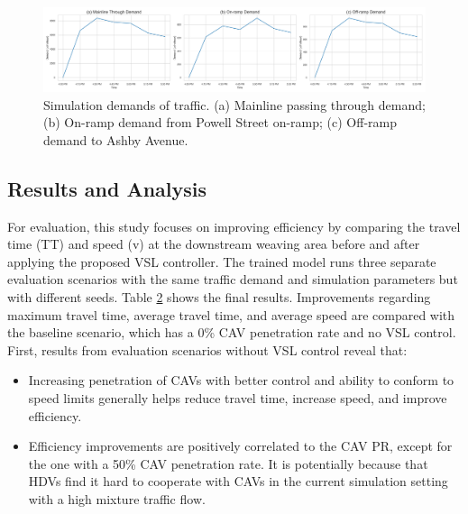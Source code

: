 \documentclass[11pt, letterpaper]{article}
\begin{document}
\begin{figure}[!ht]
    \centering
    \includegraphics[width=\textwidth]{img/demands.png}
    \caption{Simulation demands of traffic. (a) Mainline passing through demand; (b) On-ramp demand from Powell Street on-ramp; (c) Off-ramp demand to Ashby Avenue.}
    \label{fig:4}
\end{figure}

\subsection{Results and Analysis}

For evaluation, this study focuses on improving efficiency by comparing the travel time (TT) and speed (v) at the downstream weaving area before and after applying the proposed VSL controller. The trained model runs three separate evaluation scenarios with the same traffic demand and simulation parameters but with different seeds. Table \hyperref[tab:2]{2} shows the final results. Improvements regarding maximum travel time, average travel time, and average speed are compared with the baseline scenario, which has a 0\% CAV penetration rate and no VSL control. First, results from evaluation scenarios without VSL control reveal that:
\begin{itemize}
    \item Increasing penetration of CAVs with better control and ability to conform to speed limits generally helps reduce travel time, increase speed, and improve efficiency.
    \item Efficiency improvements are positively correlated to the CAV PR, except for the one with a 50\% CAV penetration rate. It is potentially because that HDVs find it hard to cooperate with CAVs in the current simulation setting with a high mixture traffic flow.
\end{itemize}
\end{document}
